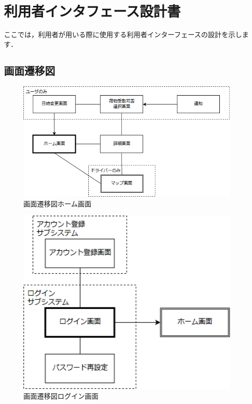\documentclass[a4j,titlepage]{jarticle}
\begin{document}
\newpage

\section{利用者インタフェース設計書}
ここでは，利用者が用いる際に使用する利用者インターフェースの設計を示します．

\subsection{画面遷移図}

\begin{figure}[H]
 \begin{center}
  \includegraphics[width=150mm]{screen_transition_home.png}
	\caption{画面遷移図ホーム画面}
	\label{fig:screen_transition_home}
 \end{center}

\end{figure}

\begin{figure}[H]
 \begin{center}
  \includegraphics[width=150mm]{screen_transition_login.png}
	\caption{画面遷移図ログイン画面}
	\label{fig:screen_transition_login}
 \end{center}

\end{figure}
\end{document}

